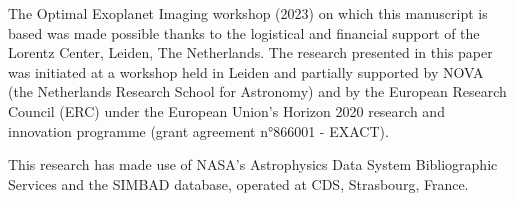 \documentclass[usenatbib]{mnras}
\begin{document}
%
%
%
%
%
%
%
%
%

The Optimal Exoplanet Imaging workshop (2023) on which this manuscript is based was made possible thanks to the logistical and financial support of the Lorentz Center, Leiden, The Netherlands. 
%
The research presented in this paper was initiated at a workshop held in Leiden and partially supported by NOVA (the Netherlands Research School for Astronomy) and by the European Research Council (ERC) under the European Union's Horizon 2020 research and innovation programme (grant agreement n°866001 - EXACT).

This research has made use of NASA's Astrophysics Data System Bibliographic Services and the SIMBAD database, operated at CDS, Strasbourg, France. 
\end{document}
